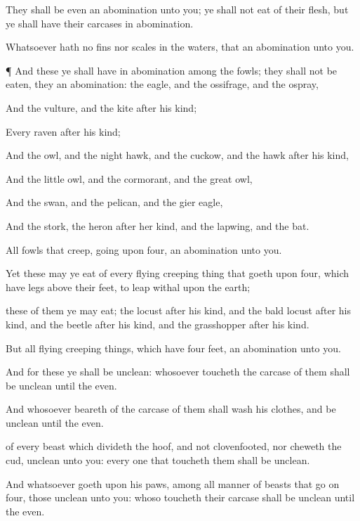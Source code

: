 {They shall be even an
abomination unto you; ye shall not
eat of their
flesh, but ye shall have their
carcases in
abomination.

Whatsoever hath no
fins nor
scales in the
waters, that
{} an
abomination unto you.


\par }{\PP {}¶ And these
{} ye shall have in
abomination
among the
fowls; they shall not be
eaten, they
{} an
abomination: the
eagle, and the
ossifrage, and the
ospray,

And the
vulture, and the
kite after his
kind;

Every
raven after his
kind;

And the
owl, and the night
hawk, and the
cuckow, and the
hawk after his
kind,

And the little
owl, and the
cormorant, and the great
owl,

And the
swan, and the
pelican, and the gier
eagle,

And the
stork, the
heron after her
kind, and the
lapwing, and the
bat.


\par }{\PP {}All
fowls that
creep,
going upon
{}
four,
{} an
abomination unto you.

Yet these may ye
eat of every
flying
creeping thing that
goeth upon
{}
four, which have
legs
above their
feet, to
leap
withal upon the
earth;

 these of them ye may
eat; the
locust after his
kind, and the bald
locust after his
kind, and the
beetle after his
kind, and the
grasshopper after his
kind.

But all
{}
flying creeping
things, which have
four
feet,
{} an
abomination unto you.

And for these ye shall be
unclean: whosoever
toucheth the
carcase of them shall be
unclean until the
even.

And whosoever
beareth
{} of the
carcase of them shall
wash his
clothes, and be
unclean until the
even.

 of every
beast which
divideth the
hoof, and
{} not
clovenfooted, nor
cheweth the
cud,
{}
unclean unto you: every one that
toucheth them shall be
unclean.

And
whatsoever
goeth upon his
paws, among all manner of
beasts that
go on
{}
four, those
{}
unclean unto you: whoso
toucheth their
carcase shall be
unclean until the
even.

}
